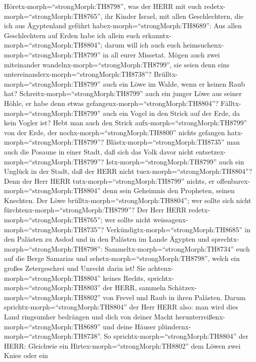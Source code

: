  Höretx-morph=``strongMorph:TH8798'', was der HERR mit euch
redetx-morph=``strongMorph:TH8765'', ihr Kinder Israel, mit allen
Geschlechtern, die ich aus Ägyptenland geführt
habex-morph=``strongMorph:TH8689'':  Aus allen Geschlechtern
auf Erden habe ich allein euch erkanntx-morph=``strongMorph:TH8804'';
darum will ich auch euch heimsuchenx-morph=``strongMorph:TH8799'' in all
eurer Missetat.  Mögen auch zwei miteinander
wandelnx-morph=``strongMorph:TH8799'', sie seien denn eins
untereinanderx-morph=``strongMorph:TH8738''? 
Brülltx-morph=``strongMorph:TH8799'' auch ein Löwe im Walde, wenn er
keinen Raub hat? Schreitx-morph=``strongMorph:TH8799'' auch ein junger
Löwe aus seiner Höhle, er habe denn etwas
gefangenx-morph=``strongMorph:TH8804''? 
Fälltx-morph=``strongMorph:TH8799'' auch ein Vogel in den Strick auf der
Erde, da kein Vogler ist? Hebt man auch den Strick
aufx-morph=``strongMorph:TH8799'' von der Erde, der
nochx-morph=``strongMorph:TH8800'' nichts gefangen
hatx-morph=``strongMorph:TH8799''? 
Blästx-morph=``strongMorph:TH8735'' man auch die Posaune in einer Stadt,
daß sich das Volk davor nicht entsetzex-morph=``strongMorph:TH8799''?
Istx-morph=``strongMorph:TH8799'' auch ein Unglück in der Stadt, daß der
HERR nicht tuex-morph=``strongMorph:TH8804''?  Denn der Herr
HERR tutx-morph=``strongMorph:TH8799'' nichts, er
offenbarex-morph=``strongMorph:TH8804'' denn sein Geheimnis den
Propheten, seinen Knechten.  Der Löwe
brülltx-morph=``strongMorph:TH8804''; wer sollte sich nicht
fürchtenx-morph=``strongMorph:TH8799''? Der Herr HERR
redetx-morph=``strongMorph:TH8765''; wer sollte nicht
weissagenx-morph=``strongMorph:TH8735''? 
Verkündigtx-morph=``strongMorph:TH8685'' in den Palästen zu Asdod und in
den Palästen im Lande Ägypten und sprechtx-morph=``strongMorph:TH8798'':
Sammeltx-morph=``strongMorph:TH8734'' euch auf die Berge Samarias und
sehetx-morph=``strongMorph:TH8798'', welch ein großes Zetergeschrei und
Unrecht darin ist!  Sie
achtenx-morph=``strongMorph:TH8804'' keines Rechts,
sprichtx-morph=``strongMorph:TH8803'' der HERR, sammeln
Schätzex-morph=``strongMorph:TH8802'' von Frevel und Raub in ihren
Palästen.  Darum sprichtx-morph=``strongMorph:TH8804'' der
Herr HERR also: man wird dies Land ringsumher bedrängen und dich von
deiner Macht herunterreißenx-morph=``strongMorph:TH8689'' und deine
Häuser plündernx-morph=``strongMorph:TH8738''.  So
sprichtx-morph=``strongMorph:TH8804'' der HERR: Gleichwie ein
Hirtex-morph=``strongMorph:TH8802'' dem Löwen zwei Kniee oder ein

